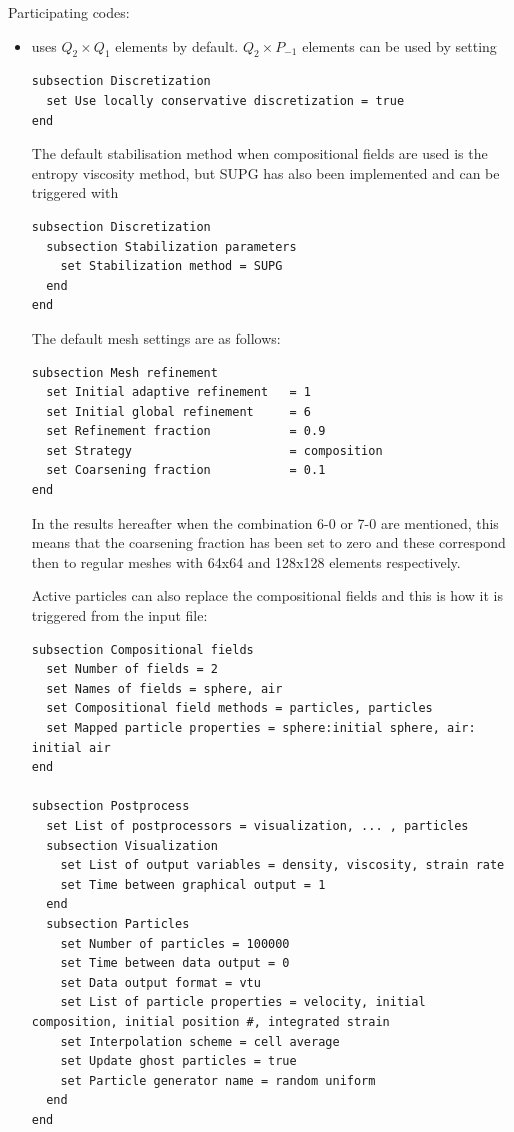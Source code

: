 Participating codes:
\begin{itemize}
\item \aspect{} uses $Q_2\times Q_1$ elements by default. $Q_2\times P_{-1}$
elements can be used by setting
\begin{lstlisting}
subsection Discretization
  set Use locally conservative discretization = true
end
\end{lstlisting}
The default stabilisation method when compositional fields are used is the 
entropy viscosity method, but SUPG has also been implemented and can be 
triggered with 
\begin{lstlisting}
subsection Discretization
  subsection Stabilization parameters
    set Stabilization method = SUPG
  end
end
\end{lstlisting}

The default mesh settings are as follows:
\begin{lstlisting}
subsection Mesh refinement
  set Initial adaptive refinement   = 1 
  set Initial global refinement     = 6 
  set Refinement fraction           = 0.9 
  set Strategy                      = composition
  set Coarsening fraction           = 0.1 
end
\end{lstlisting}

In the results hereafter when the combination 6-0 or 7-0 are mentioned, this means that the coarsening 
fraction has been set to zero and these correspond then to regular meshes with 64x64 and 128x128 elements
respectively.

Active particles can also replace the compositional fields and this is how it is triggered from the input file:

\begin{lstlisting}
subsection Compositional fields
  set Number of fields = 2 
  set Names of fields = sphere, air 
  set Compositional field methods = particles, particles
  set Mapped particle properties = sphere:initial sphere, air: initial air 
end

subsection Postprocess
  set List of postprocessors = visualization, ... , particles
  subsection Visualization
    set List of output variables = density, viscosity, strain rate
    set Time between graphical output = 1 
  end 
  subsection Particles
    set Number of particles = 100000
    set Time between data output = 0 
    set Data output format = vtu 
    set List of particle properties = velocity, initial composition, initial position #, integrated strain
    set Interpolation scheme = cell average
    set Update ghost particles = true
    set Particle generator name = random uniform
  end 
end
\end{lstlisting}


\end{itemize}
